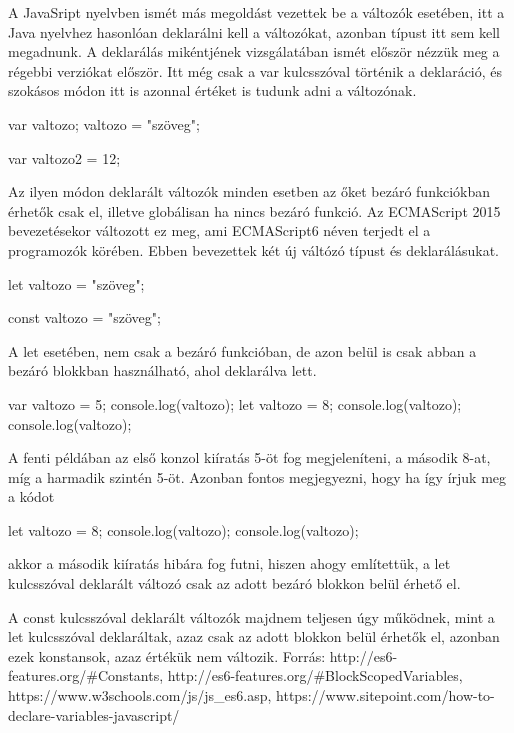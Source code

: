 A JavaSript nyelvben ismét más megoldást vezettek be a változók esetében, itt a Java nyelvhez hasonlóan deklarálni kell a változókat, azonban típust itt sem kell megadnunk. A deklarálás mikéntjének vizsgálatában ismét először nézzük meg a régebbi verziókat először. Itt még csak a var kulcsszóval történik a deklaráció, és szokásos módon itt is azonnal értéket is tudunk adni a változónak.

\begin{cpp}
	var valtozo;
	valtozo = "szöveg";
	
	var valtozo2 = 12;
\end{cpp}

Az ilyen módon deklarált változók minden esetben az őket bezáró funkciókban érhetők csak el, illetve globálisan ha nincs bezáró funkció.
Az ECMAScript 2015 bevezetésekor változott ez meg, ami ECMAScript6 néven terjedt el a programozók körében. Ebben bevezettek két új váltózó típust és deklarálásukat.

\begin{cpp}
	let valtozo = "szöveg";
	
	const valtozo = "szöveg";
\end{cpp}

A let esetében, nem csak a bezáró funkcióban, de azon belül is csak abban a bezáró blokkban használható, ahol deklarálva lett.

\begin{cpp}
	var valtozo = 5;
	console.log(valtozo);
	{
		let valtozo = 8;
		console.log(valtozo);
	}
	console.log(valtozo);

\end{cpp}

A fenti példában az első konzol kiíratás 5-öt fog megjeleníteni, a második 8-at, míg a harmadik szintén 5-öt. Azonban fontos megjegyezni, hogy ha így írjuk meg a kódot

\begin{cpp}
	{
		let valtozo = 8;
		console.log(valtozo);
	}
	console.log(valtozo);
	
\end{cpp}

akkor a második kiíratás hibára fog futni, hiszen ahogy említettük, a let kulcsszóval deklarált változó csak az adott bezáró blokkon belül érhető el.

A const kulcsszóval deklarált változók majdnem teljesen úgy működnek, mint a let kulcsszóval deklaráltak, azaz csak az adott blokkon belül érhetők el, azonban ezek konstansok, azaz értékük nem változik.
Forrás: http://es6-features.org/#Constants, http://es6-features.org/#BlockScopedVariables, https://www.w3schools.com/js/js\_es6.asp, https://www.sitepoint.com/how-to-declare-variables-javascript/

